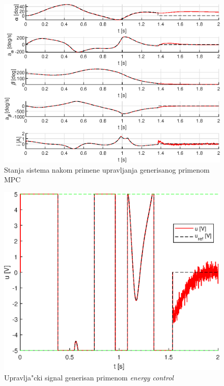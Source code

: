 \documentclass[a4paper,11pt]{article}
\theoremstyle{definition} \newtheorem{deff}{Definicija}[section]
\theoremstyle{definition} \newtheorem{prim}[deff]{Primer}
\theoremstyle{plain} \newtheorem{teor}[deff]{Teorema}
\begin{document}
	\begin{figure}[!h]
		\centering
		\includegraphics[width=.9\linewidth]{slike/States_MPC_trajectory_norm2.eps}
		\caption{Stanja sistema nakom primene upravljanja generisanog primenom MPC}
		\label{fig:traj_MPC}
	\end{figure}
	\clearpage
	
	\begin{figure}[!h]
		\centering
		\includegraphics[width=0.6\linewidth]{slike/Control_EnergyControl_trajectory.eps}
		\caption{Upravlja"cki signal generisan primenom \emph{energy control}}
		\label{fig:cntrl_energycntrl}
	\end{figure}
	
\end{document}
